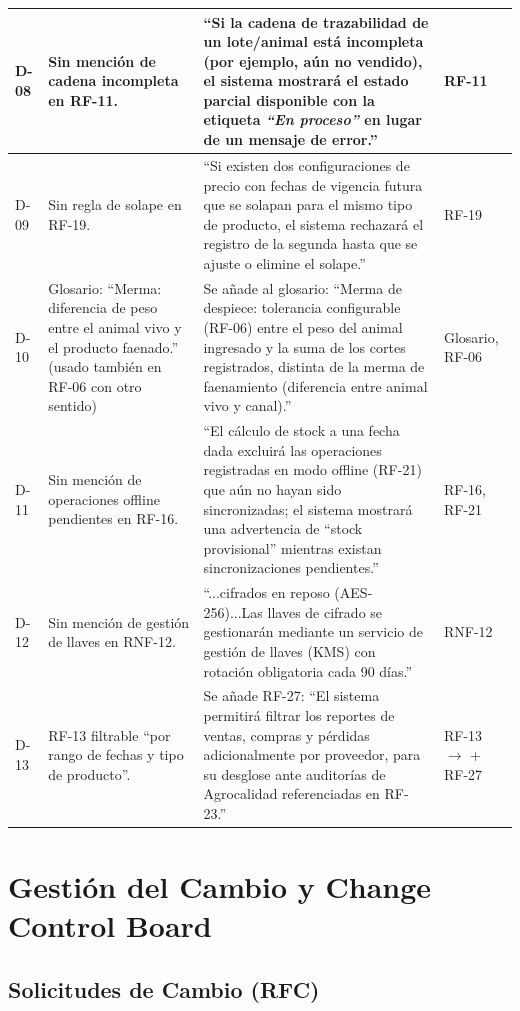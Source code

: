 \documentclass[11pt,a4paper]{article}
\begin{document}
\begin{longtable}{|p{0.8cm}|p{5.4cm}|p{5.4cm}|p{1.4cm}|}
\hline
D-08 & Sin mención de cadena incompleta en RF-11. & “Si la cadena de trazabilidad de un lote/animal está incompleta (por ejemplo, aún no vendido), el sistema mostrará el estado parcial disponible con la etiqueta \textit{“En proceso”} en lugar de un mensaje de error.” & RF-11 \\
\hline
D-09 & Sin regla de solape en RF-19. & “Si existen dos configuraciones de precio con fechas de vigencia futura que se solapan para el mismo tipo de producto, el sistema rechazará el registro de la segunda hasta que se ajuste o elimine el solape.” & RF-19 \\
\hline
D-10 & Glosario: “Merma: diferencia de peso entre el animal vivo y el producto faenado.” (usado también en RF-06 con otro sentido) & Se añade al glosario: “Merma de despiece: tolerancia configurable (RF-06) entre el peso del animal ingresado y la suma de los cortes registrados, distinta de la merma de faenamiento (diferencia entre animal vivo y canal).” & Glosario, RF-06 \\
\hline
D-11 & Sin mención de operaciones offline pendientes en RF-16. & “El cálculo de stock a una fecha dada excluirá las operaciones registradas en modo offline (RF-21) que aún no hayan sido sincronizadas; el sistema mostrará una advertencia de “stock provisional” mientras existan sincronizaciones pendientes.” & RF-16, RF-21 \\
\hline
D-12 & Sin mención de gestión de llaves en RNF-12. & “...cifrados en reposo (AES-256)...Las llaves de cifrado se gestionarán mediante un servicio de gestión de llaves (KMS) con rotación obligatoria cada 90 días.” & RNF-12 \\
\hline
D-13 & RF-13 filtrable “por rango de fechas y tipo de producto”. & Se añade RF-27: “El sistema permitirá filtrar los reportes de ventas, compras y pérdidas adicionalmente por proveedor, para su desglose ante auditorías de Agrocalidad referenciadas en RF-23.” & RF-13 $\to$ + RF-27 \\
\hline
\end{longtable}

\section{Gestión del Cambio y Change Control Board}
\subsection{Solicitudes de Cambio (RFC)}
\end{document}
